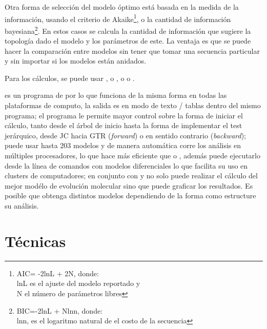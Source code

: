 Otra forma de selecci\'on del modelo \'optimo  est\'a basada en la medida de la informaci\'on, usando el criterio de Akaike\footnote{AIC= -2lnL + 2N, donde:\\lnL es el ajuste del modelo reportado y \\N el n\'umero de par\'ametros libres}, 
o la cantidad de informaci\'on bayesiana\footnote{BIC=-2lnL + Nlnn, donde: \\lnn, es el logaritmo natural de el costo de la secuencia}.  
En estos casos se calcula la cantidad de informaci\'on que sugiere la topolog\'ia dado el modelo y los par\'ametros de este. La ventaja es que se puede hacer la comparaci\'on entre modelos sin tener que tomar una secuencia particular y sin importar si los modelos est\'an anidados.

Para los c\'alculos, se puede usar , o , o  o . 
 
 es un programa de  por lo que funciona de la misma forma en todas las plataformas de computo, la  salida es en modo de texto / tablas dentro del mismo programa; el programa le permite mayor control sobre la forma de iniciar el c\'alculo, tanto desde el \'arbol de inicio hasta la forma de implementar el test jer\'arquico, desde JC hacia GTR (\textit{forward}) o en sentido contrario  (\textit{backward}); 
puede usar hasta 203 modelos y de manera  autom\'atica corre los an\'alisis en m\'ultiples procesadores, lo que hace m\'as eficiente que  o , adem\'as puede ejecutarlo desde la l\'inea de comandos con modelos diferenciales lo que facilita su uso en clusters de computadores;  en conjunto con  y  no solo puede realizar el c\'alculo del mejor mod\'elo de evoluci\'on molecular sino que puede graficar los resultados. Es posible que obtenga distintos modelos dependiendo de la forma como estructure su an\'alisis. 


\section*{T\'ecnicas}

%
\noindent

